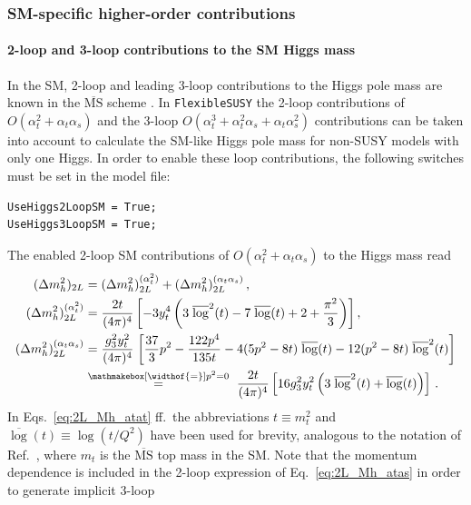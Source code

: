 \documentclass[final,3p,11pt,pdflatex]{elsarticle}
\makeatletter
\newcommand{\fs}{\texttt{FlexibleSUSY}\@\xspace}
\newcommand{\ol}[1]{\overline{#1}}
\newcommand{\MSbar}{\ensuremath{\ol{\text{MS}}}\xspace}
\newcommand{\barlog}{\overline{\log}}
\def\at{\alpha_t}
\def\as{\alpha_s}
\makeatother
\begin{document}
\subsubsection{SM-specific higher-order contributions}

\paragraph{2-loop and 3-loop contributions to the SM Higgs mass}

In the SM, 2-loop and leading 3-loop contributions to the Higgs pole
mass are known in the \MSbar scheme
\cite{Degrassi:2012ry,Martin:2014cxa,Vega:2015fna}.  In \fs the 2-loop
contributions of $O(\at^2 + \at \as)$
\cite{Degrassi:2012ry,Martin:2014cxa} and the 3-loop
$O(\at^3 + \at^2 \as + \at \as^2)$ contributions \cite{Martin:2014cxa}
can be taken into account to calculate the SM-like Higgs pole mass for
non-SUSY models with only one Higgs.  In order to enable these loop
contributions, the following switches must be set in the model file:
%
\begin{lstlisting}
UseHiggs2LoopSM = True;
UseHiggs3LoopSM = True;
\end{lstlisting}
%
The enabled 2-loop SM contributions of
$O(\at^2 + \at \as)$ to the Higgs mass read
%
\begin{align}
  (\Delta m_h^2)_{2L} &= (\Delta m_h^2)_{2L}^{(\at^2)} + (\Delta m_h^2)_{2L}^{(\at\as)} \,, \\
  (\Delta m_h^2)_{2L}^{(\at^2)} &=
  \frac{2 t}{(4\pi)^4} \left[
    -3 y_t^4 \left(3 \;\barlog^2(t) - 7 \;\barlog(t) + 2 + \frac{\pi^2}{3}\right)
  \right] , \label{eq:2L_Mh_atat}\\
  (\Delta m_h^2)_{2L}^{(\at\as)} &=
      \frac{g_3^2 y_t^2}{(4\pi)^4} \;\bigg[
        \frac{37}{3} p^2 - \frac{122 p^4}{135 t} - 4 (5 p^2 - 8 t) \;\barlog(t) -
        12 (p^2 - 8 t) \;\barlog^2(t) \bigg] \label{eq:2L_Mh_atas} \\
  &\stackrel{\mathmakebox[\widthof{=}]{p^2=0}}{=} \
  \frac{2 t}{(4\pi)^4} \left[
    16 g_3^2 y_t^2 \left(3 \;\barlog^2(t) + \barlog(t)\right)
  \right] \,.
\end{align}
%
In Eqs.~\eqref{eq:2L_Mh_atat} ff.\ the abbreviations
$t \equiv m_t^2$ and $\barlog(t) \equiv \log(t/Q^2)$ have been used
for brevity, analogous to the notation of Ref.~\cite{Martin:2014cxa},
where $m_t$ is the \MSbar top mass in the SM\@.  Note
that the momentum dependence is included in the 2-loop expression of
Eq.~\eqref{eq:2L_Mh_atas} in order to generate implicit 3-loop
\end{document}
